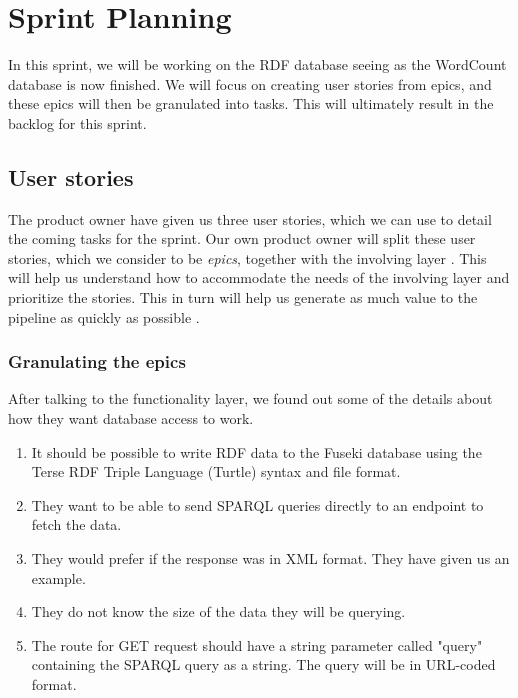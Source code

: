 \section{Sprint Planning}
In this sprint, we will be working on the RDF database seeing as the WordCount database is now finished.
We will focus on creating user stories from epics, and these epics will then be granulated into tasks.
This will ultimately result in the backlog for this sprint.

\subsection{User stories}
The \knox{} product owner have given us three user stories, which we can use to detail the coming tasks for the sprint.
Our own product owner will split these user stories, which we consider to be \textit{epics}, together with the involving layer \cite{Epics}.
This will help us understand how to accommodate the needs of the involving layer and prioritize the stories.
This in turn will help us generate as much value to the pipeline as quickly as possible \cite{UserStories}.


\subsubsection*{Granulating the epics}
After talking to the functionality layer, we found out some of the details about how they want database access to work. 

\begin{enumerate}
    \item It should be possible to write RDF data to the Fuseki database using the Terse RDF Triple Language (Turtle) syntax and file format.
    \item They want to be able to send SPARQL queries directly to an endpoint to fetch the data.
    \item They would prefer if the response was in XML format. They have given us an example.
    \item They do not know the size of the data they will be querying.
    \item The route for GET request should have a string parameter called "query" containing the SPARQL query as a string.
    The query will be in URL-coded format.
\end{enumerate}

